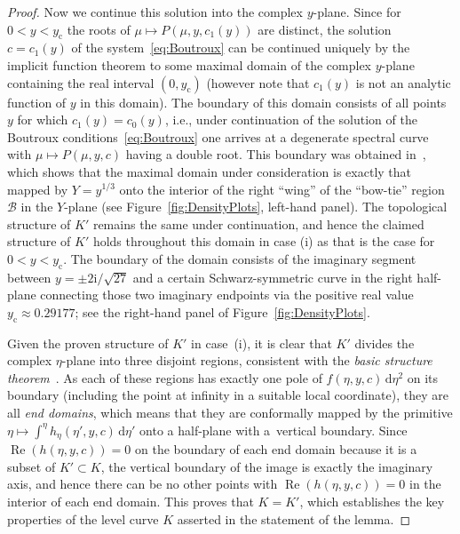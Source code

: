 \documentclass[pdftex]{sigma}
\numberwithin{equation}{section}
\begin{document}
\begin{proof}
Now we continue this solution into the complex $y$-plane. Since for $0<y<y_\mathrm{c}$ the roots of $\mu\mapsto P(\mu,y,c_1(y))$ are distinct, the solution $c=c_1(y)$ of the system~\eqref{eq:Boutroux} can be continued uniquely by the implicit function theorem to some maximal domain of the complex $y$-plane containing the real interval $(0,y_\mathrm{c})$ (however note that $c_1(y)$ is not an analytic function of $y$ in this domain). The boundary of this domain consists of all points $y$ for which $c_1(y)=c_0(y)$, i.e., under continuation of the solution of the Boutroux conditions~\eqref{eq:Boutroux} one arrives at a degenerate spectral curve with $\mu\mapsto P(\mu,y,c)$ having a double root. This boundary was obtained in~\cite[Section 4.7]{BuckinghamM22}, which shows that the maximal domain under consideration is exactly that mapped by $Y=y^{1/3}$ onto the interior of the right ``wing'' of the ``bow-tie'' region $\mathcal{B}$ in the $Y$-plane (see Figure~\ref{fig:DensityPlots}, left-hand panel). The topological structure of $K'$ remains the same under continuation, and hence the claimed structure of $K'$ holds throughout this domain in case (i) as that is the case for $0<y<y_\mathrm{c}$. The boundary of the domain consists of the imaginary segment between $y=\pm 2\mathrm{i}/
\sqrt{27}$ and a certain Schwarz-symmetric curve in the right half-plane connecting those two imaginary endpoints via the positive real value $y_\mathrm{c}\approx 0.29177$; see the right-hand panel of Figure~\ref{fig:DensityPlots}.

Given the proven structure of $K'$ in case~(i), it is clear that $K'$ divides the complex $\eta$-plane into three disjoint regions, consistent with the \emph{basic structure theorem}~\cite[p.~37]{Jenkins58}. As each of these regions has exactly one pole of $f(\eta,y,c)\,\mathrm{d}\eta^2$ on its boundary (including the point at infinity in a suitable local coordinate), they are all \emph{end domains}, which means that they are conformally mapped by the primitive $\eta\mapsto \int^\eta h_\eta(\eta',y,c)\,\mathrm{d}\eta'$ onto a half-plane with a~vertical boundary. Since $\operatorname{Re}(h(\eta,y,c))=0$ on the boundary of each end domain because it is a subset of $K'\subset K$, the vertical boundary of the image is exactly the imaginary axis, and hence there can be no other points with $\operatorname{Re}(h(\eta,y,c))=0$ in the interior of each end domain. This proves that $K=K'$, which establishes the key properties of the level curve $K$ asserted in the statement of the lemma.


\end{proof}
\end{document}
